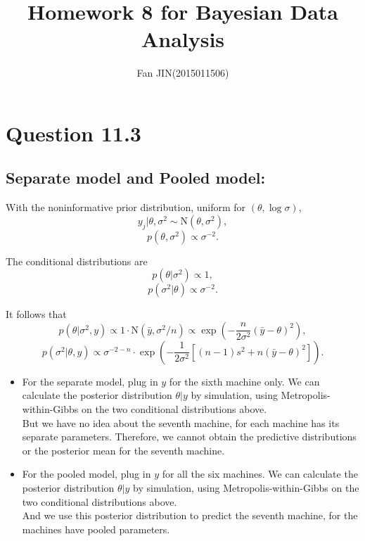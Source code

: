 \documentclass{article}
\begin{document}
\title{\textsf{Homework 8 for Bayesian Data Analysis}}
\author{Fan JIN\quad (2015011506)}
\maketitle

\section*{Question 11.3}
{
    \subsection*{Separate model and Pooled model:}
    {
        With the noninformative prior distribution, uniform for $(\theta, \log{\sigma})$,
        $$y_j | \theta, \sigma^2 \sim \mathrm{N}(\theta, \sigma^2),$$
        $$p(\theta, \sigma^2) \propto \sigma^{-2}.$$

        The conditional distributions are
        $$p(\theta | \sigma^2) \propto 1,$$
        $$p(\sigma^2 | \theta) \propto \sigma^{-2}.$$

        It follows that 
        $$p(\theta | \sigma^2, y) \propto 1 \cdot \mathrm{N}(\bar{y}, \sigma^2/n) \propto \exp{\left( -\frac{n}{2\sigma^2} (\bar{y}-\theta)^2 \right)},$$
        $$p(\sigma^2 | \theta, y) \propto \sigma^{-2-n} \cdot \exp{\left( -\frac{1}{2\sigma^2} \left[ (n-1)s^2 + n(\bar{y}-\theta)^2 \right] \right)}.$$

        \begin{itemize}

        \item For the separate model, plug in $y$ for the sixth machine only. 
        We can calculate the posterior distribution $\theta | y$ by simulation, using Metropolis-within-Gibbs on the two conditional distributions above. 
        \\ But we have no idea about the seventh machine, for each machine has its separate parameters. 
        Therefore, we cannot obtain the predictive distributions or the posterior mean for the seventh machine.

        \item For the pooled model, plug in $y$ for all the six machines. 
        We can calculate the posterior distribution $\theta | y$ by simulation, using Metropolis-within-Gibbs on the two conditional distributions above. 
        \\ And we use this posterior distribution to predict the seventh machine, for the machines have pooled parameters. 


\end{itemize}}}
\end{document}
